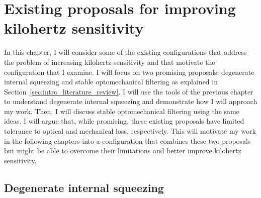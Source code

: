 \chapter{Existing proposals for improving kilohertz sensitivity} %
\label{chp:proposals}

In this chapter, I will consider some of the existing configurations that address the problem of increasing kilohertz sensitivity and that motivate the configuration that I examine. I will focus on two promising proposals: degenerate internal squeezing and stable optomechanical filtering as explained in Section~\ref{sec:intro_literature_review}. I will use the tools of the previous chapter to understand degenerate internal squeezing and demonstrate how I will approach my work. Then, I will discuss stable optomechanical filtering using the same ideas. %
I will argue that, while promising, these existing proposals have limited tolerance to optical and mechanical loss, respectively. This will motivate my work in the following chapters into a configuration that combines these two proposals but might be able to overcome their limitations and better improve kilohertz sensitivity. 


\section{Degenerate internal squeezing}
\label{sec:dIS}

